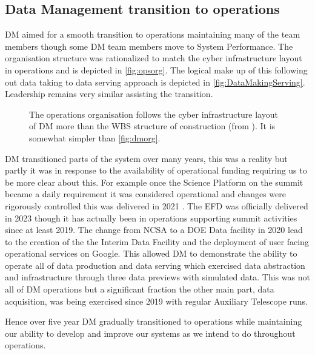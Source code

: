 \subsection{ Data Management transition to operations} \label{sec:transition}

DM aimed for a smooth transition to operations maintaining many of the team members though some DM team members move to System Performance.
The organisation structure was rationalized to match the cyber infrastructure layout in operations and is depicted in \autoref{fig:opsorg}.
The logical make up of this following out data taking to data serving approach is depicted in \autoref{fig:DataMakingServing}.
Leadership remains very similar assisting the transition.

\begin{figure}
\caption{ The operations organisation follows the cyber infrastructure layout of DM more than the WBS structure of construction (from \cite{RTN-046}).
 It is somewhat simpler than \autoref{fig:dmorg}.  \label{fig:opsorg}}
\end{figure}


DM transitioned parts of the system over many years, this was a reality  but partly it was in response to the availability of operational funding requiring us to be more clear about this.
For example once the Science Platform on the summit became a daily requirement it was considered operational and changes were rigorously controlled
this was delivered in 2021 \citep{RTN-019}.
The EFD was officially delivered in 2023 though it has actually been in operations supporting summit activities  since at least 2019.
The change from NCSA to a DOE Data facility in 2020 lead to the creation of the the Interim Data Facility  and the deployment of user facing operational services on Google\citep{2021arXiv211115030O}.
This allowed DM to demonstrate the ability to operate all  of data production and  data serving  which exercised data abstraction and infrastructure through three data previews with simulated data.
This was not all of DM operations but a significant fraction the other main part, data acquisition, was being exercised since 2019 with regular Auxiliary Telescope runs.

Hence over five year DM gradually transitioned to operations while maintaining our ability to develop and improve our systems as we intend to do throughout operations.

